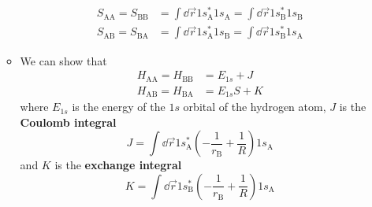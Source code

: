 \documentclass[../notes.tex]{subfiles}
\begin{document}
\begin{itemize}
\begin{itemize}
\begin{align*}
            S_{\text{A}\text{A}} = S_{\text{B}\text{B}} &= \int\dd{\vec{r}}1s_\text{A}^*1s_\text{A} = \int\dd{\vec{r}}1s_\text{B}^*1s_\text{B}\\
            S_{\text{A}\text{B}} = S_{\text{B}\text{A}} &= \int\dd{\vec{r}}1s_\text{A}^*1s_\text{B} = \int\dd{\vec{r}}1s_\text{B}^*1s_\text{A}
        \end{align*}
        \item We can show that
        \begin{align*}
            H_{\text{A}\text{A}} = H_{\text{B}\text{B}} &= E_{1s}+J\\
            H_{\text{A}\text{B}} = H_{\text{B}\text{A}} &= E_{1s}S+K
        \end{align*}
        where $E_{1s}$ is the energy of the $1s$ orbital of the hydrogen atom, $J$ is the \textbf{Coulomb integral}
        \begin{equation*}
            J = \int\dd{\vec{r}}1s_\text{A}^*\left( -\frac{1}{r_\text{B}}+\frac{1}{R} \right)1s_\text{A}
        \end{equation*}
        and $K$ is the \textbf{exchange integral}
        \begin{equation*}
            K = \int\dd{\vec{r}}1s_\text{B}^*\left( -\frac{1}{r_\text{B}}+\frac{1}{R} \right)1s_\text{A}
        \end{equation*}
    \end{itemize}
\end{itemize}
\end{document}

